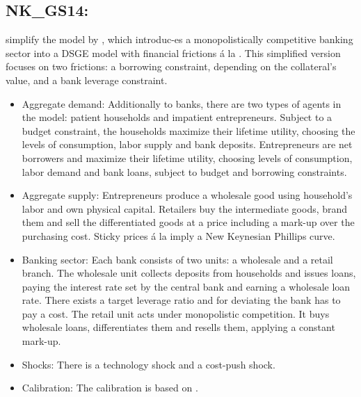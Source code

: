 \documentclass[11pt,a4paper]{article}
\begin{document}
	
	
	\subsection{NK\_GS14: \texorpdfstring{\cite{gambacorta2014should}}{Gambacorta and Signoretti (2014)}}
	\label{NKGS14}
	\cite{gambacorta2014should} simplify the model by \cite{Geralietal2010}, which introduc-es a monopolistically competitive banking sector into a DSGE model with financial frictions \'{a} la \cite{Iacoviello2005}. This simplified version focuses on two frictions: a borrowing constraint, depending on the collateral's value, and a bank leverage constraint.
	
	\begin{itemize}
		\item Aggregate demand: Additionally to banks, there are two types of agents in the model: patient households and impatient entrepreneurs. Subject to a budget constraint, the households maximize their lifetime utility, choosing the levels of consumption, labor supply and bank deposits. Entrepreneurs are net borrowers and maximize their lifetime utility, choosing levels of consumption, labor demand and bank loans, subject to budget and borrowing constraints.
		
		\item Aggregate  supply: Entrepreneurs produce a wholesale good using household's labor and own physical capital. Retailers buy the intermediate goods, brand them and sell the differentiated goods at a price including a mark-up over the purchasing cost. Sticky prices \'{a} la \cite{Rotemberg1982} imply a New Keynesian Phillips curve.
		
		\item Banking sector: Each bank consists of two units: a wholesale and a retail branch. The wholesale unit collects deposits from households and issues loans, paying the interest rate set by the central bank and earning a wholesale loan rate. There exists a target leverage ratio and for deviating the bank has to pay a cost. The retail unit acts under monopolistic competition. It buys wholesale loans, differentiates them and resells them, applying a constant mark-up.
		
		\item Shocks: There is a technology shock and a cost-push shock.
		
		\item Calibration: The calibration is based on \cite{Geralietal2010}.
	\end{itemize}
	
\end{document}
